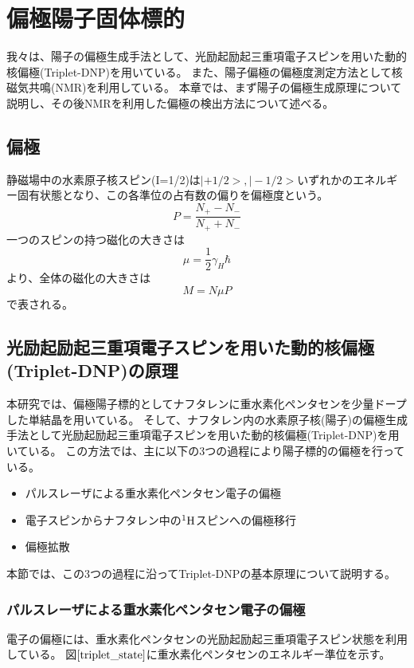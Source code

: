 \chapter{偏極陽子固体標的}
我々は、陽子の偏極生成手法として、光励起励起三重項電子スピンを用いた動的核偏極(Triplet-DNP)を用いている。
また、陽子偏極の偏極度測定方法として核磁気共鳴(NMR)を利用している。
本章では、まず陽子の偏極生成原理について説明し、その後NMRを利用した偏極の検出方法について述べる。

\section{偏極}
静磁場中の水素原子核スピン(I=1/2)は$|+1/2>, |-1/2>$いずれかのエネルギー固有状態となり、この各準位の占有数の偏りを偏極度という。
\begin{equation}
  P=\frac{N_+-N_-}{N_++N_-}
\end{equation}
一つのスピンの持つ磁化の大きさは
\begin{equation}
  \mu=\frac{1}{2}{\gamma_H} \hbar
\end{equation}
より、全体の磁化の大きさは
\begin{equation}
  M=N \mu P
\end{equation}
で表される。

\section{光励起励起三重項電子スピンを用いた動的核偏極(Triplet-DNP)の原理}
本研究では、偏極陽子標的としてナフタレンに重水素化ペンタセンを少量ドープした単結晶を用いている。
そして、ナフタレン内の水素原子核(陽子)の偏極生成手法として光励起励起三重項電子スピンを用いた動的核偏極(Triplet-DNP)を用いている。
この方法では、主に以下の3つの過程により陽子標的の偏極を行っている。

\begin{itemize}
  \item パルスレーザによる重水素化ペンタセン電子の偏極
  \item 電子スピンからナフタレン中の${}^1\rm{H}$スピンへの偏極移行
  \item 偏極拡散
\end{itemize}
本節では、この3つの過程に沿ってTriplet-DNPの基本原理について説明する。

\subsection{パルスレーザによる重水素化ペンタセン電子の偏極}
電子の偏極には、重水素化ペンタセンの光励起励起三重項電子スピン状態を利用している。
図$\ref{triplet_state}$に重水素化ペンタセンのエネルギー準位を示す。

